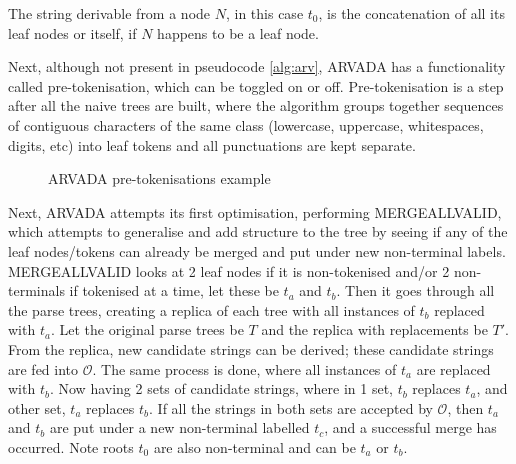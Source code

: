 The string derivable from a node $N$, in this case $t_0$, is the concatenation of all its leaf nodes or itself, if $N$ happens to be a leaf node. 

\vspace{\baselineskip}
Next, although not present in pseudocode \ref{alg:arv}, ARVADA has a functionality called pre-tokenisation, which can be toggled on or off. Pre-tokenisation is a step after all the naive trees are built, where the algorithm groups together sequences of contiguous characters of the same class (lowercase, uppercase, whitespaces, digits, etc) into leaf tokens and all punctuations are kept separate.

\begin{figure}[h!]
\centering
{}

\caption{ARVADA pre-tokenisations example}
\label{fig:tokenisedNaiveTrees}
\end{figure}

Next, ARVADA attempts its first optimisation, performing MERGEALLVALID, which attempts to generalise and add structure to the tree by seeing if any of the leaf nodes/tokens can already be merged and put under new non-terminal labels. MERGEALLVALID looks at 2 leaf nodes if it is non-tokenised and/or 2 non-terminals if tokenised at a time, let these be $t_a$ and $t_b$. Then it goes through all the parse trees, creating a replica of each tree with all instances of $t_b$ replaced with $t_a$. Let the original parse trees be $T$ and the replica with replacements be $T'$. From the replica, new candidate strings can be derived; these candidate strings are fed into $\mathcal{O}$. The same process is done, where all instances of $t_a$ are replaced with $t_b$. Now having 2 sets of candidate strings, where in 1 set, $t_b$ replaces $t_a$, and other set, $t_a$ replaces $t_b$. If all the strings in both sets are accepted by $\mathcal{O}$, then $t_a$ and $t_b$ are put under a new non-terminal labelled $t_c$, and a successful merge has occurred. Note roots $t_0$ are also non-terminal and can be $t_a$ or $t_b$.


